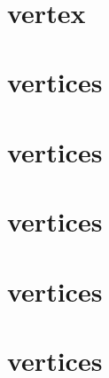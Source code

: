\documentclass[12pt]{article}
\title{ }
\date{}
\author{}
\title{}
\date{}
\author{}
\begin{document}
\section{vertex}
\begin{multicols}{4}




\end{multicols}

\section{vertices}
\begin{multicols}{4}




\end{multicols}

\section{vertices}
\begin{multicols}{4}



\end{multicols}

\section{vertices}

\begin{multicols}{4}




\end{multicols}

\section{vertices}

\begin{multicols}{4}

\end{multicols}


\section{vertices}
\end{document}
